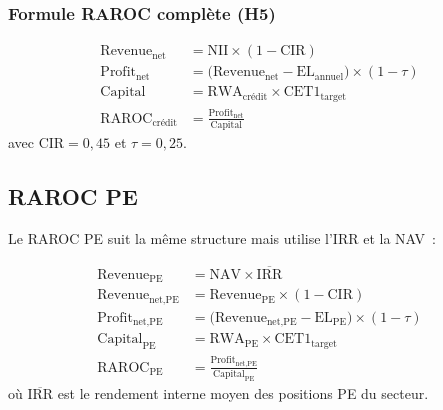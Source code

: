\documentclass[12pt,a4paper]{article}
\begin{document}
\subsubsection{Formule RAROC compl\`ete (H5)}

\begin{formulebox}
\begin{align}
    \text{Revenue}_{\text{net}} &= \text{NII} \times (1 - \text{CIR}) \label{eq:rev_net} \\
    \text{Profit}_{\text{net}} &= \bigl(\text{Revenue}_{\text{net}} - \text{EL}_{\text{annuel}}\bigr) \times (1 - \tau) \label{eq:profit_net} \\
    \text{Capital} &= \text{RWA}_{\text{cr\'edit}} \times \text{CET1}_{\text{target}} \label{eq:capital_credit} \\
    \text{RAROC}_{\text{cr\'edit}} &= \frac{\text{Profit}_{\text{net}}}{\text{Capital}} \label{eq:raroc_credit}
\end{align}
avec $\text{CIR} = 0{,}45$ et $\tau = 0{,}25$.
\end{formulebox}

\subsection{RAROC PE}

Le RAROC PE suit la m\^eme structure mais utilise l'IRR et la NAV~:

\begin{formulebox}[RAROC PE]
\begin{align}
    \text{Revenue}_{\text{PE}} &= \text{NAV} \times \overline{\text{IRR}} \label{eq:rev_pe} \\
    \text{Revenue}_{\text{net,PE}} &= \text{Revenue}_{\text{PE}} \times (1 - \text{CIR}) \label{eq:rev_net_pe} \\
    \text{Profit}_{\text{net,PE}} &= \bigl(\text{Revenue}_{\text{net,PE}} - \text{EL}_{\text{PE}}\bigr) \times (1 - \tau) \label{eq:profit_net_pe} \\
    \text{Capital}_{\text{PE}} &= \text{RWA}_{\text{PE}} \times \text{CET1}_{\text{target}} \label{eq:capital_pe} \\
    \text{RAROC}_{\text{PE}} &= \frac{\text{Profit}_{\text{net,PE}}}{\text{Capital}_{\text{PE}}} \label{eq:raroc_pe}
\end{align}
o\`u $\overline{\text{IRR}}$ est le rendement interne moyen des positions PE du secteur.
\end{formulebox}
\end{document}
